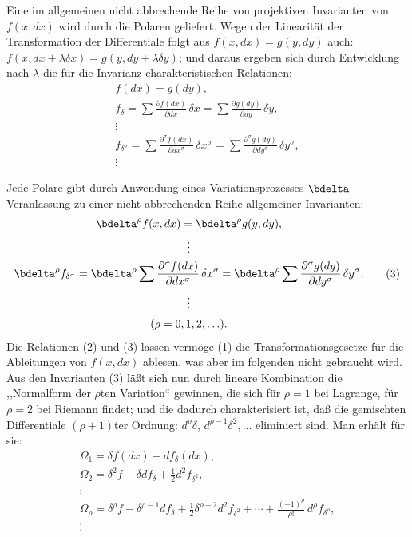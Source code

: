 Eine im allgemeinen nicht abbrechende Reihe von projektiven Invarianten
von \(f(x,dx)\) wird durch die Polaren geliefert. Wegen der Linearität
der Transformation der Differentiale folgt aus
\(f(x,dx)=g(y,dy)\) auch:
\(f(x,dx+\lambda\delta x)=g(y,dy+\lambda\delta y)\); und daraus ergeben
sich durch Entwicklung nach \(\lambda\) die für die Invarianz
charakteristischen Relationen:
\begin{equation}
\begin{gathered}
f(dx)=g(dy),\\
f_\delta=\sum\frac{\partial f(dx)}{\partial dx}\,\delta x
       =\sum\frac{\partial g(dy)}{\partial dy}\,\delta y,\\
\vdots\\
f_{\delta^\sigma}=
\sum\frac{\partial^\sigma f(dx)}{\partial dx^\sigma}\,\delta x^\sigma
=
\sum\frac{\partial^\sigma g(dy)}{\partial dy^\sigma}\,\delta y^\sigma,\\
\vdots
\end{gathered}
\tag{2}
\end{equation}

Jede Polare gibt durch Anwendung eines Variationsprozesses \(\bdelta\)
Veranlassung zu einer nicht abbrechenden Reihe allgemeiner Invarianten:
\begin{equation}
\begin{gathered}
\bdelta^\rho f(x,dx)=\bdelta^\rho g(y,dy),\\
\vdots\\
\bdelta^\rho f_{\delta^\sigma}
=\bdelta^\rho\sum\frac{\partial^\sigma f(dx)}{\partial dx^\sigma}\,
\delta x^\sigma
=\bdelta^\rho\sum\frac{\partial^\sigma g(dy)}{\partial dy^\sigma}\,
\delta y^\sigma,\\
\vdots\\[0.2em]
(\rho=0,1,2,\ldots).
\end{gathered}
\tag{3}
\end{equation}
Die Relationen (2) und (3) lassen vermöge (1) die Transformationsgesetze
für die Ableitungen von \(f(x,dx)\) ablesen, was aber im folgenden
nicht gebraucht wird. Aus den Invarianten (3) läßt sich nun durch
lineare Kombination die ,,Normalform der \(\rho\)ten Variation``
gewinnen, die sich für \(\rho=1\) bei Lagrange, für \(\rho=2\) bei
Riemann findet; und die dadurch charakterisiert ist, daß die gemischten
Differentiale \((\rho+1)\)ter Ordnung: \(d^\rho\delta\),
\(d^{\rho-1}\delta^2,\ldots\) eliminiert sind. Man erhält für sie:
\begin{equation}
\begin{gathered}
\Omega_1=\delta f(dx)-d f_\delta(dx),\\
\Omega_2=\delta^2 f-\delta d f_\delta+\frac12 d^2 f_{\delta^2},\\
\vdots\\
\Omega_\rho=\delta^\rho f-\delta^{\rho-1}d f_\delta
+\frac12\delta^{\rho-2}d^2 f_{\delta^2}
+\cdots+\frac{(-1)^\rho}{\rho!}\,d^\rho f_{\delta^\rho},\\
\vdots
\end{gathered}
\tag{4}
\end{equation}

